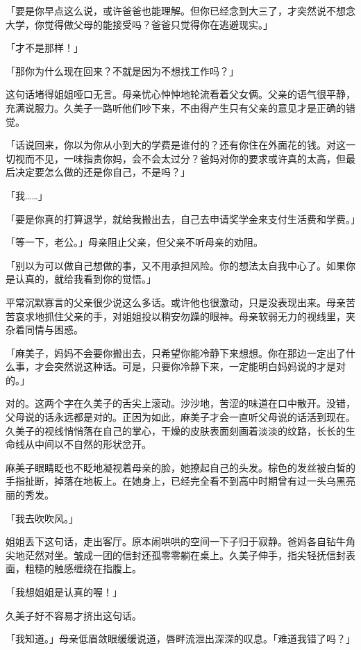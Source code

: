 \documentclass[UTF8]{ctexart}
\begin{document}
    「要是你早点这么说，或许爸爸也能理解。但你已经念到大三了，才突然说不想念大学，你觉得做父母的能接受吗？爸爸只觉得你在逃避现实。」 

    「才不是那样！」 

    「那你为什么现在回来？不就是因为不想找工作吗？」 

    这句话堵得姐姐哑口无言。母亲忧心忡忡地轮流看着父女俩。父亲的语气很平静，充满说服力。久美子一路听他们吵下来，不由得产生只有父亲的意见才是正确的错觉。 

    「话说回来，你以为你从小到大的学费是谁付的？还有你住在外面花的钱。对这一切视而不见，一味指责你妈，会不会太过分？爸妈对你的要求或许真的太高，但最后决定要怎么做的还是你自己，不是吗？」 

    「我……」 

    「要是你真的打算退学，就给我搬出去，自己去申请奖学金来支付生活费和学费。」 

    「等一下，老公。」母亲阻止父亲，但父亲不听母亲的劝阻。 

    「别以为可以做自己想做的事，又不用承担风险。你的想法太自我中心了。如果你是认真的，就给我看到你的觉悟。」 

    平常沉默寡言的父亲很少说这么多话。或许他也很激动，只是没表现出来。母亲苦苦哀求地抓住父亲的手，对姐姐投以稍安勿躁的眼神。母亲软弱无力的视线里，夹杂着同情与困惑。 

    「麻美子，妈妈不会要你搬出去，只希望你能冷静下来想想。你在那边一定出了什么事，才会突然说这种话。可是，只要你冷静下来，一定能明白妈妈说的才是对的。」 

    对的。这两个字在久美子的舌尖上滚动。沙沙地，苦涩的味道在口中散开。没错，父母说的话永远都是对的。正因为如此，麻美子才会一直听父母说的话活到现在。久美子的视线悄悄落在自己的掌心，干燥的皮肤表面刻画着淡淡的纹路，长长的生命线从中间以不自然的形状岔开。 

    麻美子眼睛眨也不眨地凝视着母亲的脸，她撩起自己的头发。棕色的发丝被白皙的手指扯断，掉落在地板上。在她身上，已经完全看不到高中时期曾有过一头乌黑亮丽的秀发。 

    「我去吹吹风。」 

    姐姐丢下这句话，走出客厅。原本闹哄哄的空间一下子归于寂静。爸妈各自钻牛角尖地茫然对坐。皱成一团的信封还孤零零躺在桌上。久美子伸手，指尖轻抚信封表面，粗糙的触感缠绕在指腹上。 

    「我想姐姐是认真的喔！」 

    久美子好不容易才挤出这句话。 

    「我知道。」母亲低眉敛眼缓缓说道，唇畔流泄出深深的叹息。「难道我错了吗？」 
\end{document}
